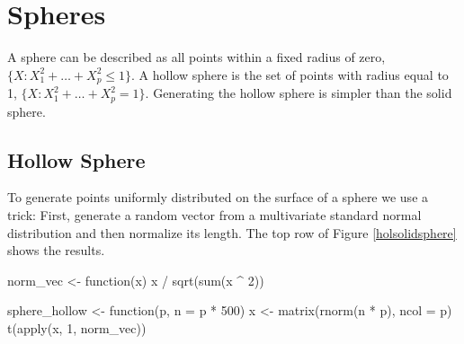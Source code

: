 \section{Spheres}

A sphere can be described as all
points within a fixed radius of zero, $\{X: X_1^2+\dots + X_p^2 \leq 1\}$.  A hollow sphere is the set of points with radius equal to 1, $\{X: X_1^2+\dots + X_p^2 = 1\}$. Generating the hollow sphere is simpler than the solid sphere.

\subsection{Hollow Sphere}

To generate points uniformly distributed on the surface of a sphere we
use a trick: First, generate a random vector from a multivariate
standard normal distribution and then normalize its length. The top
row of Figure \ref{holsolidsphere} shows the results.

\begin{example}
norm_vec <- function(x) {
  x / sqrt(sum(x ^ 2))
}

sphere_hollow <- function(p, n = p * 500) {
  x <- matrix(rnorm(n * p), ncol = p)
  t(apply(x, 1, norm_vec))
}
\end{example}

